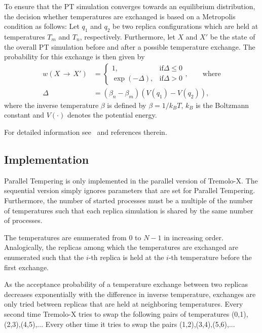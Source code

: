 To ensure that the PT simulation converges towards an equilibrium distribution, the decision whether temperatures are exchanged is based on a Metropolis condition as follows:
Let $q_1$ and $q_2$ be two replica configurations which are held at temperatures $T_m$ and $T_n$, respectively.
Furthermore, let $X$ and $X'$ be the state of the overall PT simulation before and after a possible temperature exchange.
The probability for this exchange is then given by
\begin{align*}
w\left(X\,\rightarrow\,X'\right) &=
  \begin{cases}
    1,             & \text{if} \Delta\leq 0 \\
    \exp(-\Delta), & \text{if} \Delta > 0
  \end{cases},\qquad\text{where} \\
\Delta &= \left(\beta_n-\beta_m\right)\left(V\left(q_1\right)-V\left(q_2\right)\right),
\end{align*}
where the inverse temperature $\beta$ is defined by $\beta=1/k_B T$, $k_B$ is the Boltzmann constant and $V(\cdot)$ denotes the potential energy.

For detailed information see~\cite{Sugita1999} and references therein.

\subsection{Implementation}

Parallel Tempering is only implemented in the parallel version of Tremolo-X. The sequential version simply ignores parameters that are set for Parallel Tempering.
Furthermore, the number of started processes must be a multiple of the number of temperatures such that each replica simulation is shared by the same number of processes.

The temperatures are enumerated from 0 to $N-1$ in increasing order.
Analogically, the replicas among which the temperatures are exchanged are enumerated such that the $i$-th replica is held at the $i$-th temperature before the first exchange.

As the acceptance probability of a temperature exchange between two replicas decreases exponentially with the difference in inverse temperature, exchanges are only tried between replicas that are held at neighboring temperatures.
Every second time Tremolo-X tries to swap the following pairs of temperatures (0,1),(2,3),(4,5),...
Every other time it tries to swap the pairs (1,2),(3,4),(5,6),...

